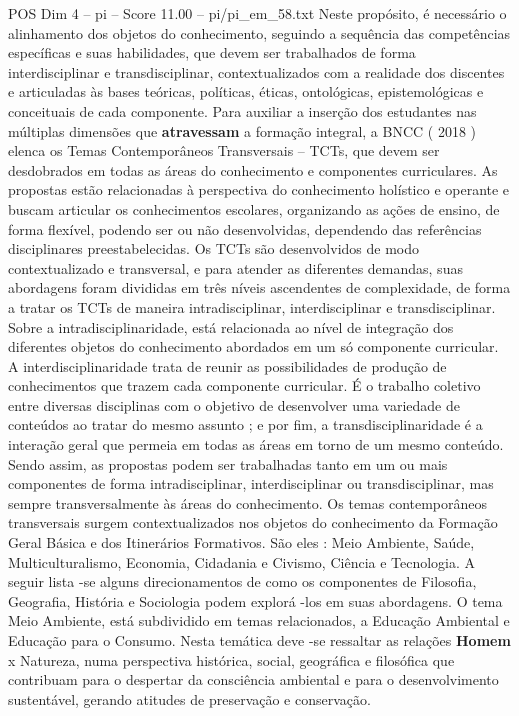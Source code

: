 \begin{textsample}{POS Dim 4 – pi – Score 11.00 – pi/pi\_em\_58.txt}
Neste propósito, é necessário o alinhamento dos objetos do conhecimento, seguindo a sequência das competências específicas e suas habilidades, que devem ser trabalhados de forma interdisciplinar e transdisciplinar, contextualizados com a realidade dos discentes e articuladas às bases teóricas, políticas, éticas, ontológicas, epistemológicas e conceituais de cada componente.
Para auxiliar a inserção dos estudantes nas múltiplas dimensões que \textbf{atravessam} a formação integral, a BNCC ( 2018 ) elenca os Temas Contemporâneos Transversais – TCTs, que devem ser desdobrados em todas as áreas do conhecimento e componentes curriculares.
As propostas estão relacionadas à perspectiva do conhecimento holístico e operante e buscam articular os conhecimentos escolares, organizando as ações de ensino, de forma flexível, podendo ser ou não desenvolvidas, dependendo das referências disciplinares preestabelecidas.
Os TCTs são desenvolvidos de modo contextualizado e transversal, e para atender as diferentes demandas, suas abordagens foram divididas em três níveis ascendentes de complexidade, de forma a tratar os TCTs de maneira intradisciplinar, interdisciplinar e transdisciplinar.
Sobre a intradisciplinaridade, está relacionada ao nível de integração dos diferentes objetos do conhecimento abordados em um só componente curricular.
A interdisciplinaridade trata de reunir as possibilidades de produção de conhecimentos que trazem cada componente curricular.
É o trabalho coletivo entre diversas disciplinas com o objetivo de desenvolver uma variedade de conteúdos ao tratar do mesmo assunto ; e por fim, a transdisciplinaridade é a interação geral que permeia em todas as áreas em torno de um mesmo conteúdo.
Sendo assim, as propostas podem ser trabalhadas tanto em um ou mais componentes de forma intradisciplinar, interdisciplinar ou transdisciplinar, mas sempre transversalmente às áreas do conhecimento.
Os temas contemporâneos transversais surgem contextualizados nos objetos do conhecimento da Formação Geral Básica e dos Itinerários Formativos.
São eles : Meio Ambiente, Saúde, Multiculturalismo, Economia, Cidadania e Civismo, Ciência e Tecnologia.
A seguir lista -se alguns direcionamentos de como os componentes de Filosofia, Geografia, História e Sociologia podem explorá -los em suas abordagens.
O tema Meio Ambiente, está subdividido em temas relacionados, a Educação Ambiental e Educação para o Consumo.
Nesta temática deve -se ressaltar as relações \textbf{Homem} x Natureza, numa perspectiva histórica, social, geográfica e filosófica que contribuam para o despertar da consciência ambiental e para o desenvolvimento sustentável, gerando atitudes de preservação e conservação.

\end{textsample}
